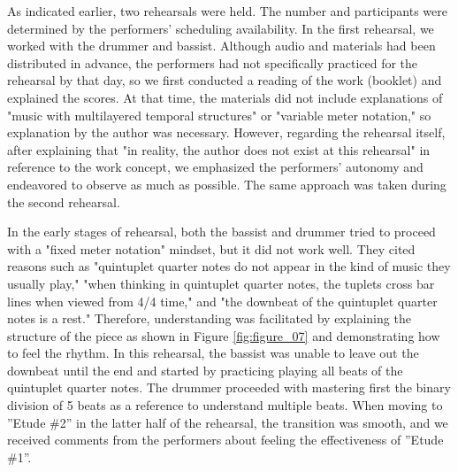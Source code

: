 As indicated earlier, two rehearsals were held. The number and participants were determined by the performers' scheduling availability. In the first rehearsal, we worked with the drummer and bassist. Although audio and materials had been distributed in advance, the performers had not specifically practiced for the rehearsal by that day, so we first conducted a reading of the work (booklet) and explained the scores. At that time, the materials did not include explanations of "music with multilayered temporal structures" or "variable meter notation," so explanation by the author was necessary. However, regarding the rehearsal itself, after explaining that "in reality, the author does not exist at this rehearsal" in reference to the work concept, we emphasized the performers' autonomy and endeavored to observe as much as possible. The same approach was taken during the second rehearsal.

In the early stages of rehearsal, both the bassist and drummer tried to proceed with a "fixed meter notation" mindset, but it did not work well. They cited reasons such as "quintuplet quarter notes do not appear in the kind of music they usually play," "when thinking in quintuplet quarter notes, the tuplets cross bar lines when viewed from 4/4 time," and "the downbeat of the quintuplet quarter notes is a rest." Therefore, understanding was facilitated by explaining the structure of the piece as shown in Figure \ref{fig:figure_07} and demonstrating how to feel the rhythm. In this rehearsal, the bassist was unable to leave out the downbeat until the end and started by practicing playing all beats of the quintuplet quarter notes. The drummer proceeded with mastering first the binary division of 5 beats as a reference to understand multiple beats. When moving to ''Etude \#2'' in the latter half of the rehearsal, the transition was smooth, and we received comments from the performers about feeling the effectiveness of ''Etude \#1''.

